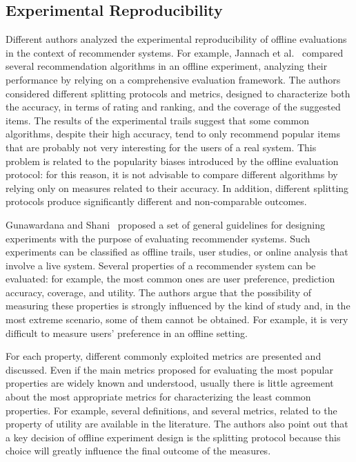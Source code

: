 \subsection{Experimental Reproducibility}

Different authors analyzed the experimental reproducibility of offline evaluations in the context of recommender systems. For example, Jannach et al.~\cite{Jannach2015} compared several recommendation algorithms in an offline experiment, analyzing their performance by relying on a comprehensive evaluation framework. The authors considered different splitting protocols and metrics, designed to characterize both the accuracy, in terms of rating and ranking, and the coverage of the suggested items. The results of the experimental trails suggest that some common algorithms, despite their high accuracy, tend to only recommend popular items that are probably not very interesting for the users of a real system. This problem is related to the popularity biases introduced by the offline evaluation protocol: for this reason, it is not advisable to compare different algorithms by relying only on measures related to their accuracy. In addition, different splitting protocols produce significantly different and non-comparable outcomes.

Gunawardana and Shani~\cite{Gunawardana2015} proposed a set of general guidelines for designing experiments with the purpose of evaluating recommender systems. Such experiments can be classified as offline trails, user studies, or online analysis that involve a live system. Several properties of a recommender system can be evaluated: for example, the most common ones are user preference, prediction accuracy, coverage, and utility. The authors argue that the possibility of measuring these properties is strongly influenced by the kind of study and, in the most extreme scenario, some of them cannot be obtained. For example, it is very difficult to measure users' preference in an offline setting.

For each property, different commonly exploited metrics are presented and discussed. Even if the main metrics proposed for evaluating the most popular properties are widely known and understood, usually there is little agreement about the most appropriate metrics for characterizing the least common properties. For example, several definitions, and several metrics, related to the property of utility are available in the literature. The authors also point out that a key decision of offline experiment design is the splitting protocol because this choice will greatly influence the final outcome of the measures.

